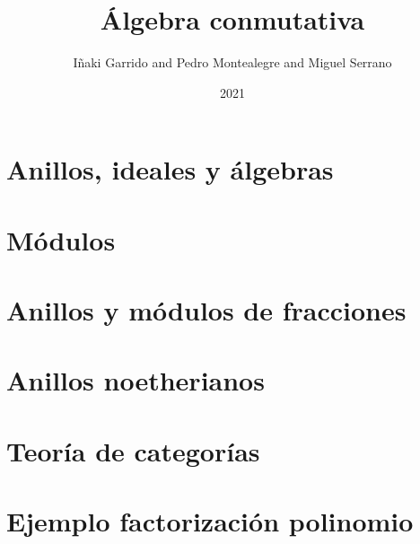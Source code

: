 \documentclass[a4paper,12pt]{book}
\title{Álgebra conmutativa}
\author{Iñaki Garrido and Pedro Montealegre and Miguel Serrano}
\date{2021}
\theoremstyle{definition}
\begin{document}
\maketitle
\chapter{Anillos, ideales y álgebras}

\chapter{Módulos}

\chapter{Anillos y módulos de fracciones}

\chapter{Anillos noetherianos}


\appendix
\chapter{Teoría de categorías}

\chapter{Ejemplo factorización polinomio}

\end{document}
